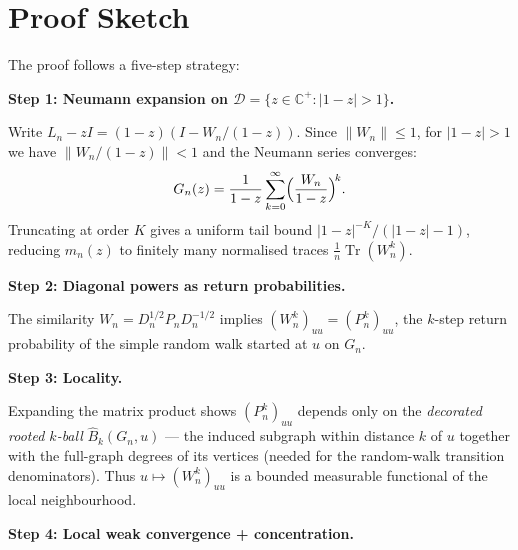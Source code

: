 \documentclass[11pt,a4paper]{article}
\begin{document}
\section{Proof Sketch}

The proof follows a five-step strategy:

\medskip
\noindent\textbf{Step 1: Neumann expansion on $\mathcal{D}=\{z\in\mathbb{C}^+:|1-z|>1\}$.}

Write $L_n - zI = (1-z)(I - W_n/(1-z))$. Since $\|W_n\|\le 1$, for $|1-z|>1$ we have $\|W_n/(1-z)\|<1$ and the Neumann series converges:
\[
  G_n(z) = \frac{1}{1-z}\sum_{k=0}^{\infty}\Bigl(\frac{W_n}{1-z}\Bigr)^{\!k}.
\]
Truncating at order $K$ gives a uniform tail bound $|1-z|^{-K}/(|1-z|-1)$, reducing $m_n(z)$ to finitely many normalised traces $\frac{1}{n}\operatorname{Tr}(W_n^k)$.

\medskip
\noindent\textbf{Step 2: Diagonal powers as return probabilities.}

The similarity $W_n = D_n^{1/2}P_n D_n^{-1/2}$ implies $(W_n^k)_{uu} = (P_n^k)_{uu}$, the $k$-step return probability of the simple random walk started at $u$ on $G_n$.

\medskip
\noindent\textbf{Step 3: Locality.}

Expanding the matrix product shows $(P_n^k)_{uu}$ depends only on the \emph{decorated rooted $k$-ball} $\widehat{B}_k(G_n,u)$ --- the induced subgraph within distance $k$ of $u$ together with the full-graph degrees of its vertices (needed for the random-walk transition denominators). Thus $u\mapsto (W_n^k)_{uu}$ is a bounded measurable functional of the local neighbourhood.

\medskip
\noindent\textbf{Step 4: Local weak convergence + concentration.}
\end{document}
